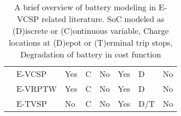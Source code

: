 \documentclass[]{article}
\begin{document}
{\begin{landscape}
\begin{table}[h!]
\begin{tabular}{llllllll}
      \citet{Cong2024}             & E-VCSP  & Yes & C   & No            & Yes         & D            & No          \\
      \addlinespace[0.4em]
      \citet{Ham2021}              & E-VRPTW & Yes & C   & No            & Yes         & D            & No          \\
      \citet{Stadnichuk2024}       & E-TVSP  & No  & C   & No            & Yes         & D/T          & No          \\
      \bottomrule
    \end{tabular}
    \caption{A brief overview of battery modeling in E-VCSP related literature. SoC modeled as (D)iscrete or (C)ontinuous variable, Charge locations at (D)epot or (T)erminal trip stops, Degradation of battery in cost function}
    \label{tab:eVCSP-lit}
  \end{table}
  \vfill
  \end{landscape}
  \clearpage
}
\end{document}
